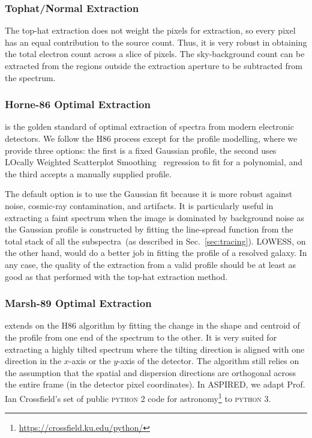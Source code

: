 \documentclass[linenumbers, twocolumn]{aastex631}
\begin{document}
\subsubsection*{Tophat/Normal Extraction}
\label{sec:tophat}
The top-hat extraction does not weight the pixels for extraction,
so every pixel has an equal contribution to the source count. Thus,
it is very robust in obtaining the total electron count across
a slice of pixels. The sky-background count can be extracted
from the regions outside the extraction aperture to be
subtracted from the spectrum.

\subsubsection*{Horne-86 Optimal Extraction}
\citet[hereafter H86]{1986PASP...98..609H} is the golden standard
of optimal extraction of spectra from modern electronic detectors.
We follow the H86 process except for the profile modelling,
where we provide three options: the first is a fixed Gaussian
profile, the second uses LOcally Weighted Scatterplot
Smoothing~\citep[LOWESS;][]{doi:10.1080/01621459.1979.10481038}
regression to fit for a polynomial, and the third accepts
a manually supplied profile.

The default option is to use the Gaussian fit because it is
more robust against noise, cosmic-ray contamination, and
artifacts. It is particularly useful in extracting a faint
spectrum when the image is dominated by background noise as the
Gaussian profile is constructed by fitting the line-spread
function from the total stack of all the
subspectra~(as described in Sec.~\ref{sec:tracing}).
LOWESS, on the other hand, would do a better job in fitting
the profile of a resolved galaxy. In any case, the quality
of the extraction from a valid profile should be at least as
good as that performed with the top-hat extraction method.

\subsubsection*{Marsh-89 Optimal Extraction}
\citet[hereafter M89]{1989PASP..101.1032M} extends on the H86 algorithm by
fitting the change in the shape and centroid of the profile from one end of the
spectrum to the other. It is very suited for extracting a highly tilted
spectrum where the tilting direction is aligned with one direction in
the $x$-axis or the $y$-axis of the detector. The algorithm still relies on the
assumption that the spatial and dispersion directions are orthogonal across
the entire frame (in the detector pixel coordinates). In \textsc{ASPIRED}, we
adapt Prof. Ian Crossfield's set of public \textsc{python 2} code for
astronomy\footnote{\url{https://crossfield.ku.edu/python/}}
to \textsc{python 3}.
\end{document}
